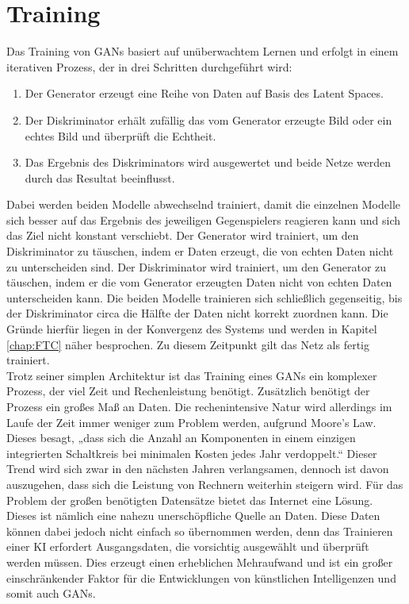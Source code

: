 \section{Training}

\noindent Das Training von \acp{GAN} basiert auf unüberwachtem Lernen und erfolgt in einem iterativen Prozess, der in drei Schritten durchgeführt wird: \\
\begin{enumerate}
    \item Der Generator erzeugt eine Reihe von Daten auf Basis des Latent Spaces.
    \item Der Diskriminator erhält zufällig das vom Generator erzeugte Bild oder ein echtes Bild und überprüft die Echtheit.
    \item Das Ergebnis des Diskriminators wird ausgewertet und beide Netze werden durch das Resultat beeinflusst. \\
\end{enumerate}

\noindent Dabei werden beiden Modelle abwechselnd trainiert, damit die einzelnen Modelle sich besser auf das Ergebnis des jeweiligen Gegenspielers reagieren kann und sich das Ziel nicht konstant verschiebt. Der Generator wird trainiert, um den Diskriminator zu täuschen, indem er Daten erzeugt, die von echten Daten nicht zu unterscheiden sind. Der Diskriminator wird trainiert, um den Generator zu täuschen, indem er die vom Generator erzeugten Daten nicht von echten Daten unterscheiden kann. Die beiden Modelle trainieren sich schließlich gegenseitig, bis der Diskriminator circa die Hälfte der Daten nicht korrekt zuordnen kann. Die Gründe hierfür liegen in der Konvergenz des Systems und werden in Kapitel \ref{chap:FTC} näher besprochen. Zu diesem Zeitpunkt gilt das Netz als fertig trainiert\cite{training}. \\

\noindent Trotz seiner simplen Architektur ist das Training eines \acp{GAN} ein komplexer Prozess, der viel Zeit und Rechenleistung benötigt. Zusätzlich benötigt der Prozess ein großes Maß an Daten. Die rechenintensive Natur wird allerdings im Laufe der Zeit immer weniger zum Problem werden, aufgrund Moore's Law. Dieses besagt, „dass sich die Anzahl an Komponenten in einem einzigen integrierten Schaltkreis bei minimalen Kosten jedes Jahr verdoppelt.“\cite{moore} Dieser Trend wird sich zwar in den nächsten Jahren verlangsamen, dennoch ist davon auszugehen, dass sich die Leistung von Rechnern weiterhin steigern wird. Für das Problem der großen benötigten Datensätze bietet das Internet eine Lösung. Dieses ist nämlich eine nahezu unerschöpfliche Quelle an Daten. Diese Daten können dabei jedoch nicht einfach so übernommen werden, denn das Trainieren einer KI erfordert Ausgangsdaten, die vorsichtig ausgewählt und überprüft werden müssen. Dies erzeugt einen erheblichen Mehraufwand und ist ein großer einschränkender Faktor für die Entwicklungen von künstlichen Intelligenzen und somit auch \acp{GAN}.
\newpage